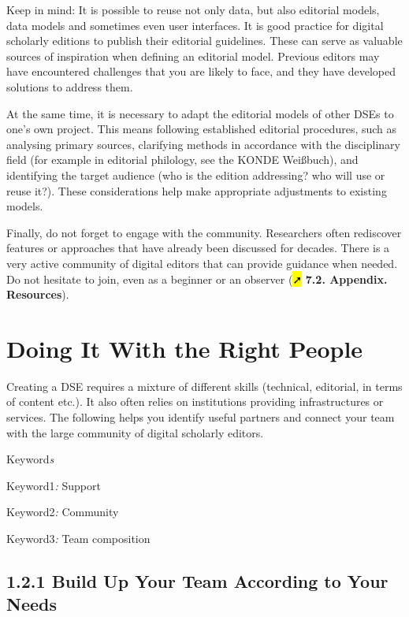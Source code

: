 \documentclass[
  letterpaper,
  DIV=11,
  numbers=noendperiod]{scrreprt}
\begin{document}
Keep in mind: It is possible to reuse not only data, but also editorial
models, data models and sometimes even user interfaces. It is good
practice for digital scholarly editions to publish their editorial
guidelines. These can serve as valuable sources of inspiration when
defining an editorial model. Previous editors may have encountered
challenges that you are likely to face, and they have developed
solutions to address them.

At the same time, it is necessary to adapt the editorial models of other
DSEs to one's own project. This means following established editorial
procedures, such as analysing primary sources, clarifying methods in
accordance with the disciplinary field (for example in editorial
philology, see the KONDE Weißbuch), and identifying the target audience
(who is the edition addressing? who will use or reuse it?). These
considerations help make appropriate adjustments to existing models.

Finally, do not forget to engage with the community. Researchers often
rediscover features or approaches that have already been discussed for
decades. There is a very active community of digital editors that can
provide guidance when needed. Do not hesitate to join, even as a
beginner or an observer (\hl{➚} \textbf{7.2. Appendix. Resources}).

\section{Doing It With the Right
People}\label{doing-it-with-the-right-people}

Creating a DSE requires a mixture of different skills (technical,
editorial, in terms of content etc.). It also often relies on
institutions providing infrastructures or services. The following helps
you identify useful partners and connect your team with the large
community of digital scholarly editors.

Keyword\emph{s}

Keyword1\emph{:} Support

Keyword2\emph{:} Community

Keyword3\emph{:} Team composition

\subsection*{1.2.1 Build Up Your Team According to Your
Needs}\label{build-up-your-team-according-to-your-needs}
\end{document}
